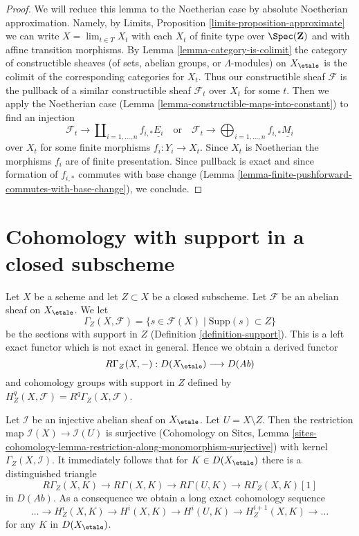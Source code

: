 \begin{proof}
We will reduce this lemma to the Noetherian case by absolute Noetherian
approximation. Namely, by
Limits, Proposition \ref{limits-proposition-approximate}
we can write $X = \lim_{t \in T} X_t$ with each $X_t$ of finite type over
$\Spec(\mathbf{Z})$ and with affine transition morphisms. By
Lemma \ref{lemma-category-is-colimit}
the category of constructible sheaves (of sets, abelian groups, or
$\Lambda$-modules) on $X_\etale$ is the colimit of the corresponding
categories for $X_t$. Thus our constructible sheaf $\mathcal{F}$
is the pullback of a similar constructible sheaf $\mathcal{F}_t$
over $X_t$ for some $t$. Then we apply the Noetherian case
(Lemma \ref{lemma-constructible-maps-into-constant})
to find an injection
$$
\mathcal{F}_t \longrightarrow
\coprod\nolimits_{i = 1, \ldots, n} f_{i, *}\underline{E_i}
\quad\text{or}\quad
\mathcal{F}_t \longrightarrow
\bigoplus\nolimits_{i = 1, \ldots, n} f_{i, *}\underline{M_i}
$$
over $X_t$ for some finite morphisms $f_i : Y_i \to X_t$.
Since $X_t$ is Noetherian the morphisms $f_i$ are of finite presentation.
Since pullback is exact and since formation of $f_{i, *}$ commutes
with base change
(Lemma \ref{lemma-finite-pushforward-commutes-with-base-change}), we conclude.
\end{proof}











\section{Cohomology with support in a closed subscheme}
\label{section-cohomology-support}

\noindent
Let $X$ be a scheme and let $Z \subset X$ be a closed subscheme.
Let $\mathcal{F}$ be an abelian sheaf on $X_\etale$. We let
$$
\Gamma_Z(X, \mathcal{F}) =
\{s \in \mathcal{F}(X) \mid \text{Supp}(s) \subset Z\}
$$
be the sections with support in $Z$ (Definition \ref{definition-support}).
This is a left exact functor which is not exact in general.
Hence we obtain a derived functor
$$
R\Gamma_Z(X, -) : D(X_\etale) \longrightarrow D(\textit{Ab})
$$
and cohomology groups with support in $Z$ defined by
$H^q_Z(X, \mathcal{F}) = R^q\Gamma_Z(X, \mathcal{F})$.

\medskip\noindent
Let $\mathcal{I}$ be an injective abelian sheaf on $X_\etale$.
Let $U = X \setminus Z$.
Then the restriction map $\mathcal{I}(X) \to \mathcal{I}(U)$ is surjective
(Cohomology on Sites, Lemma
\ref{sites-cohomology-lemma-restriction-along-monomorphism-surjective})
with kernel $\Gamma_Z(X, \mathcal{I})$. It immediately follows that
for $K \in D(X_\etale)$ there is a distinguished triangle
$$
R\Gamma_Z(X, K) \to R\Gamma(X, K) \to R\Gamma(U, K) \to R\Gamma_Z(X, K)[1]
$$
in $D(\textit{Ab})$. As a consequence we obtain a long exact cohomology
sequence
$$
\ldots \to H^i_Z(X, K) \to H^i(X, K) \to H^i(U, K) \to
H^{i + 1}_Z(X, K) \to \ldots
$$
for any $K$ in $D(X_\etale)$.

